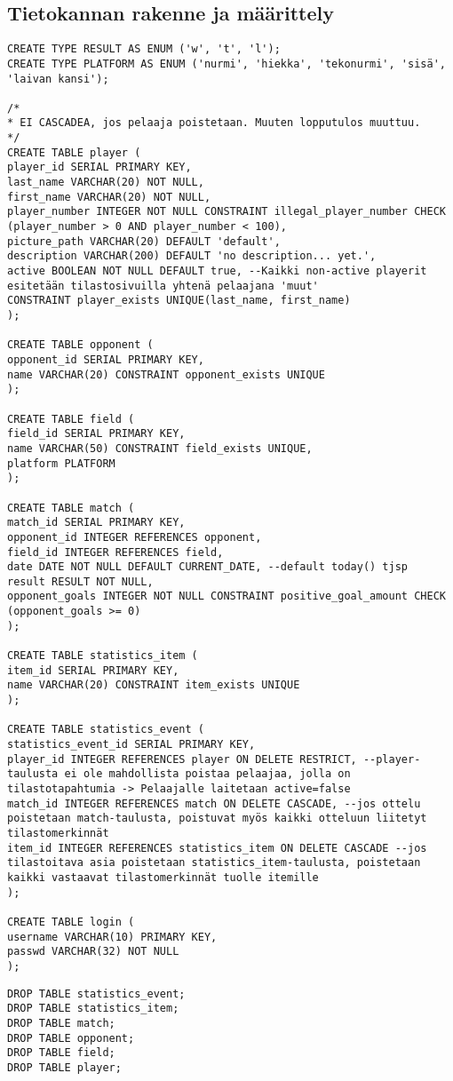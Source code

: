 \documentclass[12pt]{article} %
\begin{document}
\subsection{Tietokannan rakenne ja määrittely} %
\lstset{frame=single, language=SQL, caption=Create Table Statements, basicstyle=\footnotesize, breaklines=true,}
\begin{lstlisting}
CREATE TYPE RESULT AS ENUM ('w', 't', 'l');
CREATE TYPE PLATFORM AS ENUM ('nurmi', 'hiekka', 'tekonurmi', 'sisä', 'laivan kansi');

/*
* EI CASCADEA, jos pelaaja poistetaan. Muuten lopputulos muuttuu.
*/
CREATE TABLE player (
player_id SERIAL PRIMARY KEY,
last_name VARCHAR(20) NOT NULL,
first_name VARCHAR(20) NOT NULL,
player_number INTEGER NOT NULL CONSTRAINT illegal_player_number CHECK (player_number > 0 AND player_number < 100),
picture_path VARCHAR(20) DEFAULT 'default',
description VARCHAR(200) DEFAULT 'no description... yet.',
active BOOLEAN NOT NULL DEFAULT true, --Kaikki non-active playerit esitetään tilastosivuilla yhtenä pelaajana 'muut'
CONSTRAINT player_exists UNIQUE(last_name, first_name)
);

CREATE TABLE opponent (
opponent_id SERIAL PRIMARY KEY,
name VARCHAR(20) CONSTRAINT opponent_exists UNIQUE
);

CREATE TABLE field (
field_id SERIAL PRIMARY KEY,
name VARCHAR(50) CONSTRAINT field_exists UNIQUE,
platform PLATFORM
);

CREATE TABLE match (
match_id SERIAL PRIMARY KEY,
opponent_id INTEGER REFERENCES opponent,
field_id INTEGER REFERENCES field,
date DATE NOT NULL DEFAULT CURRENT_DATE, --default today() tjsp
result RESULT NOT NULL,
opponent_goals INTEGER NOT NULL CONSTRAINT positive_goal_amount CHECK (opponent_goals >= 0)
);

CREATE TABLE statistics_item (
item_id SERIAL PRIMARY KEY,
name VARCHAR(20) CONSTRAINT item_exists UNIQUE
);

CREATE TABLE statistics_event (
statistics_event_id SERIAL PRIMARY KEY,
player_id INTEGER REFERENCES player ON DELETE RESTRICT, --player-taulusta ei ole mahdollista poistaa pelaajaa, jolla on tilastotapahtumia -> Pelaajalle laitetaan active=false
match_id INTEGER REFERENCES match ON DELETE CASCADE, --jos ottelu poistetaan match-taulusta, poistuvat myös kaikki otteluun liitetyt tilastomerkinnät
item_id INTEGER REFERENCES statistics_item ON DELETE CASCADE --jos tilastoitava asia poistetaan statistics_item-taulusta, poistetaan kaikki vastaavat tilastomerkinnät tuolle itemille
);

CREATE TABLE login (
username VARCHAR(10) PRIMARY KEY,
passwd VARCHAR(32) NOT NULL
);

\end{lstlisting}
\begin{lstlisting}[caption=Drop Table Statements]
DROP TABLE statistics_event;
DROP TABLE statistics_item;
DROP TABLE match;
DROP TABLE opponent;
DROP TABLE field;
DROP TABLE player;
\end{lstlisting}
\end{document}
